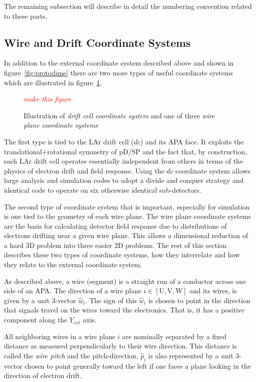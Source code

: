 \documentclass[letterpaper,twoside,onecolumn,article]{memoir}
\newcommand{\fixme}[1]{\textcolor{red}{\textit{#1}}}
\newcommand{\pD}{pD/SP\xspace}
\begin{document}
The remaining subsection will describe in detail the numbering
convention related to these parts.

\subsection{Wire and Drift Coordinate Systems}

In addition to the external coordinate system described above and
shown in figure~\ref{fig:protodune} there are two more types of useful
coordinate systems which are illustrated in
figure~\ref{fig:coordsystems}.

\begin{figure}[h]
  \centering
  \fixme{make this figure}
  \caption{Illustration of \textit{drift cell coordinate system} and one of three \textit{wire plane coordinate systems}}
  \label{fig:coordsystems}
\end{figure}

The first type is tied to the LAr drift cell ($dc$) and its APA face.
It exploits the translational+rotational symmetry of \pD and the fact
that, by construction, each LAr drift cell operates essentially
independent from others in terms of the physics of electron drift and
field response.  Using the $dc$ coordinate system allows large
analysis and simulation codes to adopt a divide and conquer strategy
and identical code to operate on six otherwise identical
sub-detectors.

The second type of coordinate system that is important, especially for
simulation is one tied to the geometry of each wire plane.  The wire
plane coordinate systems are the basis for calculating detector field
response due to distributions of electrons drifting near a given wire
plane.  This allows a dimensional reduction of a hard 3D problem into
three easier 2D problems.  The rest of this section describes these
two types of coordinate systems, how they interrelate and how they
relate to the external coordinate system.

As described above, a wire (segment) is a straight run of a conductor
across one side of an APA.  The direction of a wire plane
$i \in [\mbox{U}, \mbox{V}, \mbox{W}]$ and its wires, is given by a
unit 3-vector $\hat{w}_i$.  The sign of this $\hat{w}_i$ is chosen to
point in the direction that signals travel on the wires toward the
electronics.  That is, it has a positive component along the $Y_{ext}$
axis.

All neighboring wires in a wire plane $i$ are nominally separated by a
fixed distance as measured perpendicularly to their wire direction.
This distance is called the \textit{wire pitch} and the
pitch-direction, $\hat{p}_i$ is also represented by a unit 3-vector
chosen to point generally toward the left if one faces a plane looking
in the direction of electron drift.
\end{document}
